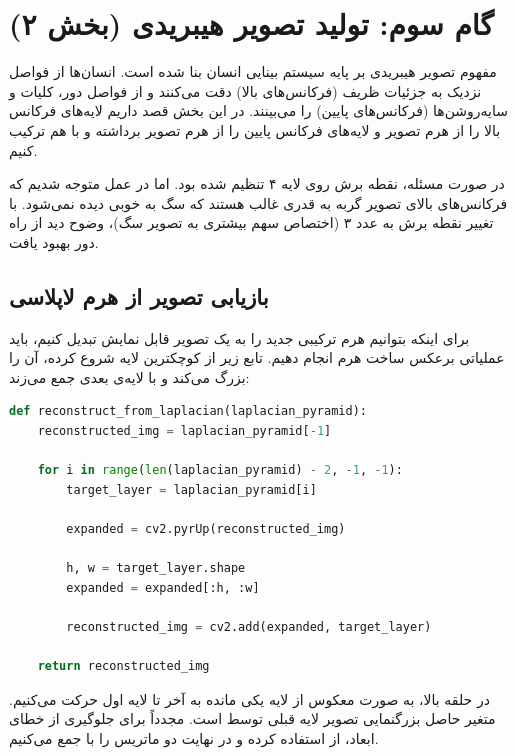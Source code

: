 \section{گام سوم: تولید تصویر هیبریدی (بخش ۲)}

مفهوم تصویر هیبریدی  بر پایه سیستم بینایی انسان بنا شده است. انسان‌ها از فواصل نزدیک به جزئیات ظریف (فرکانس‌های بالا) دقت می‌کنند و از فواصل دور، کلیات و سایه‌روشن‌ها (فرکانس‌های پایین) را می‌بینند. در این بخش قصد داریم لایه‌های فرکانس بالا را از هرم تصویر  و لایه‌های فرکانس پایین را از هرم تصویر  برداشته و با هم ترکیب کنیم.

\begin{tipbox}
در صورت مسئله، نقطه برش روی لایه ۴ تنظیم شده بود. اما در عمل متوجه شدیم که فرکانس‌های بالای تصویر گربه به قدری غالب هستند که سگ به خوبی دیده نمی‌شود. با تغییر نقطه برش به عدد ۳ (اختصاص سهم بیشتری به تصویر سگ)، وضوح دید از راه دور بهبود یافت.
\end{tipbox}

\subsection{بازیابی تصویر از هرم لاپلاسی}
برای اینکه بتوانیم هرم ترکیبی جدید را به یک تصویر قابل نمایش تبدیل کنیم، باید عملیاتی برعکس ساخت هرم انجام دهیم. تابع زیر از کوچکترین لایه شروع کرده، آن را بزرگ می‌کند و با لایه‌ی بعدی جمع می‌زند:

\begin{codebox}
\begin{lstlisting}[language=Python]
def reconstruct_from_laplacian(laplacian_pyramid):
    reconstructed_img = laplacian_pyramid[-1]
    
    for i in range(len(laplacian_pyramid) - 2, -1, -1):
        target_layer = laplacian_pyramid[i]
        
        expanded = cv2.pyrUp(reconstructed_img)
        
        h, w = target_layer.shape
        expanded = expanded[:h, :w]
        
        reconstructed_img = cv2.add(expanded, target_layer)
        
    return reconstructed_img
\end{lstlisting}
\end{codebox}

در حلقه  بالا، به صورت معکوس از لایه یکی مانده به آخر تا لایه اول حرکت می‌کنیم. متغیر  حاصل بزرگنمایی تصویر لایه قبلی توسط  است. مجدداً برای جلوگیری از خطای ابعاد، از  استفاده کرده و در نهایت دو ماتریس را با  جمع می‌کنیم.

